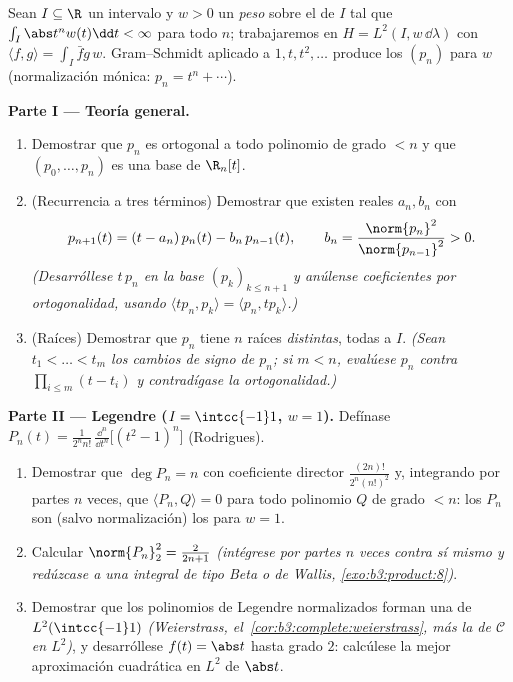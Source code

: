 \begin{problem}\label{pb:b3:hilbert:1} Sean $I \subseteq \R$ un
intervalo y $w > 0$ un \emph{peso}
 sobre el
 de $I$ tal que $\int_I
\abs t^nw(t)\dd t < \infty$ para todo $n$; trabajaremos en $H = L^2(I,
w\,\dd\lambda)$ con $\langle f, g\rangle = \int_I \bar
fg\,w$. Gram--Schmidt aplicado a $1, t, t^2, \dots$ produce los
\emph{} $(p_n)$ para $w$
(normalización mónica: $p_n = t^n + \cdots$).

\medskip
\noindent\textbf{Parte I --- Teoría general.}
\begin{enumerate}
  \item Demostrar que $p_n$ es ortogonal a todo polinomio de grado $< n$
  y que $(p_0, \dots, p_n)$ es una base de $\R_n[t]$. \item (Recurrencia
  a tres términos) Demostrar que existen reales $a_n,
        b_n$ con
        \[
        p_{n+1}(t) = (t - a_n)\,p_n(t) - b_n\,p_{n-1}(t),
        \qquad b_n = \frac{\norm{p_n}^2}{\norm{p_{n-1}}^2} >
        0 .
        \]
        \emph{(Desarróllese $t\,p_n$ en la base $(p_k)_{k \leq
        n+1}$ y anúlense coeficientes por ortogonalidad, usando
        $\langle tp_n, p_k\rangle = \langle p_n,
        tp_k\rangle$.)}
  \item (Raíces) Demostrar que $p_n$ tiene $n$ raíces \emph{distintas},
  todas  a $I$. \emph{(Sean
  $t_1 < \dots < t_m$ los cambios de signo
   de $p_n$; si $m < n$,
  evalúese $p_n$ contra $\prod_{i\leq m}(t - t_i)$ y contradígase la
  ortogonalidad.)}
\end{enumerate}

\medskip
\noindent\textbf{Parte II --- Legendre ($I = \intcc{-1}1$, $w =
1$).} Defínase $P_n(t) = \frac{1}{2^nn!}\,\frac{\dd^n}{\dd
t^n}\bigl[(t^2 - 1)^n\bigr]$ (Rodrigues).
\begin{enumerate}[resume]
  \item Demostrar que $\deg P_n = n$ con coeficiente director
  $\frac{(2n)!}{2^n(n!)^2}$ y, integrando por partes $n$ veces, que
  $\langle P_n, Q\rangle = 0$ para todo polinomio $Q$ de grado $< n$:
  los $P_n$ son (salvo normalización) los
   para $w = 1$. \item
  Calcular $\norm{P_n}_2^2 = \frac{2}{2n+1}$ \emph{(intégrese por partes
  $n$ veces contra sí mismo y redúzcase a una integral de tipo Beta o de
  Wallis,
        \cref{exo:b3:product:8})}.
  \item Demostrar que los polinomios de Legendre normalizados forman una
   de $L^2(\intcc{-1}1)$
  \emph{(Weierstrass, el~\cref{cor:b3:complete:weierstrass}, más la
   de $\mathcal C$ en $L^2$)}, y
  desarróllese $f(t) = \abs t$ hasta grado $2$: calcúlese la mejor
  aproximación cuadrática en $L^2$ de $\abs t$.
\end{enumerate}


\end{problem}
